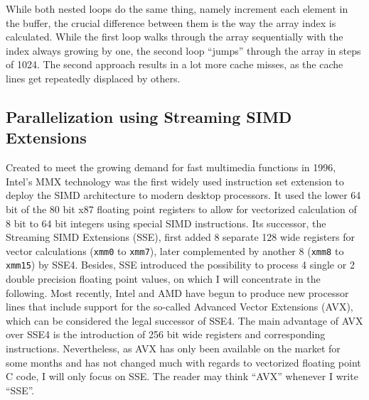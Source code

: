 While both nested loops do the same thing, namely increment each element in the buffer, the crucial difference between them is the way the array index is calculated. While the first loop walks through the array sequentially with the index always growing by one, the second loop ``jumps'' through the array in steps of 1024. The second approach results in a lot more cache misses, as the cache lines get repeatedly displaced by others.

\subsection{Parallelization using Streaming SIMD Extensions}
Created to meet the growing demand for fast multimedia functions in 1996, Intel's MMX technology was the first widely used instruction set extension to deploy the SIMD architecture to modern desktop processors. It used the lower 64 bit of the 80 bit x87 floating point registers to allow for vectorized calculation of 8 bit to 64 bit integers using special SIMD instructions. Its successor, the Streaming SIMD Extensions (SSE), first added 8 separate 128 wide registers for vector calculations (\texttt{xmm0} to \texttt{xmm7}), later complemented by another 8 (\texttt{xmm8} to \texttt{xmm15}) by SSE4. Besides, SSE introduced the possibility to process 4 single or 2 double precision floating point values, on which I will concentrate in the following. Most recently, Intel and AMD have begun to produce new processor lines that include support for the so-called Advanced Vector Extensions (AVX), which can be considered the legal successor of SSE4. The main advantage of AVX over SSE4 is the introduction of 256 bit wide registers and corresponding instructions. Nevertheless, as AVX has only been available on the market for some months and has not changed much with regards to vectorized floating point C code, I will only focus on SSE. The reader may think ``AVX'' whenever I write ``SSE''.

